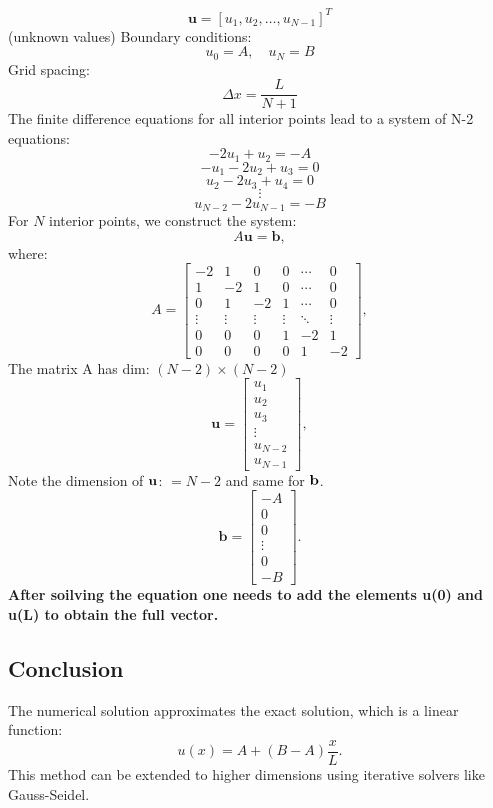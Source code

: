 \[
\mathbf{u} = \left[ u_1, u_2, \dots, u_{N-1} \right]^T
\]
(unknown values)
Boundary conditions:
\[
u_0 = A, \quad u_N = B
\]
Grid spacing:
\[
\Delta x = \frac{L}{N+1}
\]
The finite difference equations for all interior points lead to a system of N-2 equations:
\[
-2u_1 + u_2 = -A
\]
\[
-u_1 - 2u_2 + u_3 = 0
\]
\[
u_2 - 2u_3 + u_4 = 0
\]
\[
\vdots
\]
\[
u_{N-2} - 2u_{N-1} = -B
\]
For $N$ interior points, we construct the system:
\begin{equation}
    A \mathbf{u} = \mathbf{b},
\end{equation}
where:
\begin{equation}
    A =
    \begin{bmatrix}
        -2 & 1  & 0  & 0  & \cdots & 0  \\
        1  & -2 & 1  & 0  & \cdots & 0  \\
        0  & 1  & -2 & 1  & \cdots & 0  \\
        \vdots & \vdots & \vdots & \vdots & \ddots & \vdots \\
        0  & 0  & 0  & 1  & -2 & 1  \\
        0  & 0  & 0  & 0  & 1  & -2
    \end{bmatrix},
\end{equation}
The matrix A has dim: $(N-2)\times (N-2)$
\begin{equation}
    \mathbf{u} =
    \begin{bmatrix}
        u_1 \\
        u_2 \\
        u_3 \\
        \vdots \\
        u_{N-2} \\
        u_{N-1}
    \end{bmatrix},
\end{equation}
Note the dimension of $\bf{u}$:  $= N-2$ and same for $\bf{b}$. 
\begin{equation}
    \mathbf{b} =
    \begin{bmatrix}
        -A \\
        0 \\
        0 \\
        \vdots \\
        0 \\
        -B
    \end{bmatrix}.
\end{equation}
{\bf After soilving the equation one needs to add the elements u(0) and u(L) to obtain the full vector.}
\subsection{Conclusion}
The numerical solution approximates the exact solution, which is a linear function:
\begin{equation}
    u(x) = A + (B - A) \frac{x}{L}.
\end{equation}
This method can be extended to higher dimensions using iterative solvers like Gauss-Seidel.




